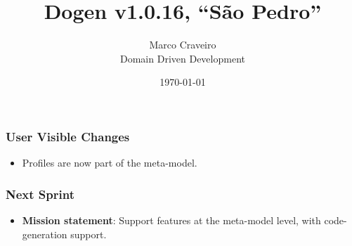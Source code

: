\documentclass{beamer}
\title{Dogen v1.0.16, \enquote{São Pedro}}
\author{Marco Craveiro \\
  Domain Driven Development
}
\date{\today}
\begin{document}
\begin{frame}
\titlepage
\end{frame}

\begin{frame}
\frametitle{User Visible Changes}

\begin{itemize}

\item Profiles are now part of the meta-model.

\end{itemize}

\end{frame}

\begin{frame}
\frametitle{Next Sprint}

\begin{itemize}
\item \textbf{Mission statement}: Support features at the meta-model
  level, with code-generation support.
\end{itemize}

\end{frame}
\end{document}
